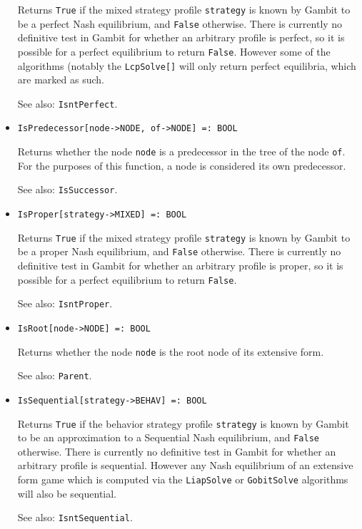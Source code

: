 \begin{itemize}
\bd 
Returns \verb+True+ if the mixed strategy profile \verb+strategy+
is known by Gambit to be a perfect Nash equilibrium, and \verb+False+
otherwise.  There is currently no definitive test in Gambit for
whether an arbitrary profile is perfect, so it is possible for a
perfect equilibrium to return \verb+False+.  However some of the
algorithms (notably the \verb+LcpSolve[]+ will only return perfect
equilibria, which are marked as such.  
\item
[See also:] {\tt IsntPerfect}.
\ed

\item
\protect \large \begin{verbatim}
IsPredecessor[node->NODE, of->NODE] =: BOOL
\end{verbatim}\normalsize

\bd
Returns whether the node \verb+node+ is a predecessor
in the tree of the node \verb+of+.  For the purposes of this function,
a node is considered its own predecessor.
\item
[See also:] {\tt IsSuccessor}.
\ed

\item
\protect \large \begin{verbatim}
IsProper[strategy->MIXED] =: BOOL
\end{verbatim}\normalsize

\bd Returns \verb+True+ if the mixed strategy profile \verb+strategy+
is known by Gambit to be a proper Nash equilibrium, and \verb+False+
otherwise.  There is currently no definitive test in Gambit for
whether an arbitrary profile is proper, so it is possible for a
perfect equilibrium to return \verb+False+.  
\item
[See also:] {\tt IsntProper}.
\ed

\item
\protect \large \begin{verbatim}
IsRoot[node->NODE] =: BOOL
\end{verbatim}\normalsize

\bd
Returns whether the node \verb+node+ is the root node of its
extensive form.
\item
[See also:] {\tt Parent}.
\ed

\item
\protect \large \begin{verbatim}
IsSequential[strategy->BEHAV] =: BOOL
\end{verbatim}\normalsize

\bd 
Returns \verb+True+ if the behavior strategy profile
\verb+strategy+ is known by Gambit to be an approximation to a
Sequential Nash equilibrium, and \verb+False+ otherwise.  There is
currently no definitive test in Gambit for whether an arbitrary
profile is sequential.  However any Nash equilibrium of an extensive
form game which is computed via the \verb+LiapSolve+ or
\verb+GobitSolve+ algorithms will also be sequential.
\item
[See also:] {\tt IsntSequential}.
\ed


\end{itemize}
